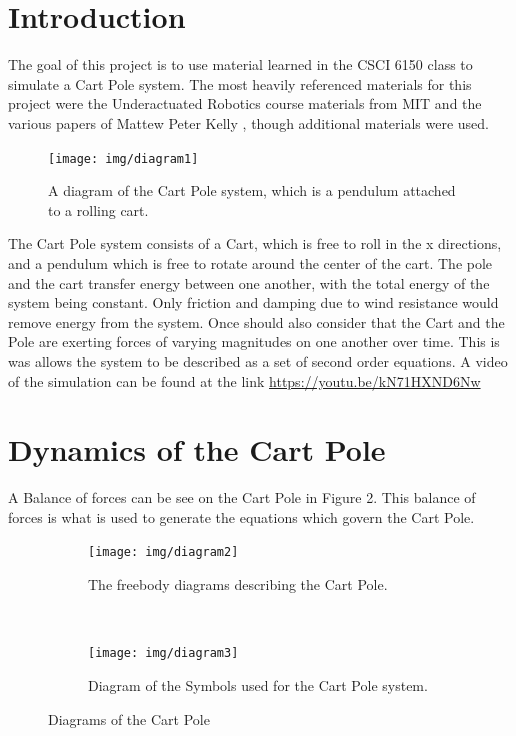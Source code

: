 \documentclass[12pt]{article}
\begin{document}
\maketitle

\section{Introduction}

The goal of this project is to use material learned in the CSCI 6150 class to simulate
a Cart Pole system. The most heavily referenced materials for this project were the
Underactuated Robotics course materials from MIT \cite{underactuated} and the various
papers of Mattew Peter Kelly \cite{mattkelly}, though additional materials were used.

\begin{figure}[!ht]
 \centering
 \texttt{[image: img/diagram1]}
 \caption{A diagram of the Cart Pole system, which is a pendulum attached to a rolling cart.\cite{mattkelly}}
 \label{fig:oof}
\end{figure}

The Cart Pole system consists of a Cart, which is free to roll in the x directions, and a
pendulum which is free to rotate around the center of the cart. The pole and the cart
transfer energy between one another, with the total energy of the system being constant.
Only friction and damping due to wind resistance would remove energy from the system.
Once should also consider that the Cart and the Pole are exerting forces of varying magnitudes
on one another over time. This is was allows the system to be described as a set of
second order equations. A video of the simulation can be found at the link \url{https://youtu.be/kN71HXND6Nw}

\newpage

\section{Dynamics of the Cart Pole}

A Balance of forces can be see on the Cart Pole in Figure 2. This balance of forces
is what is used to generate the equations which govern the Cart Pole.

\begin{figure}[!ht]
    \centering
    \begin{subfigure}[b]{0.3\textwidth}
        \texttt{[image: img/diagram2]}
        \caption{The freebody diagrams describing the Cart Pole.\cite{mattkelly}}
        \label{fig:asd123}
    \end{subfigure}
    ~ %
    \begin{subfigure}[b]{0.3\textwidth}
        \texttt{[image: img/diagram3]}
        \caption{Diagram of the Symbols used for the Cart Pole system.}
        \label{fig:qwerty}
    \end{subfigure}
    \caption{Diagrams of the Cart Pole}\label{fig:asdfasdf}
\end{figure}
\end{document}
